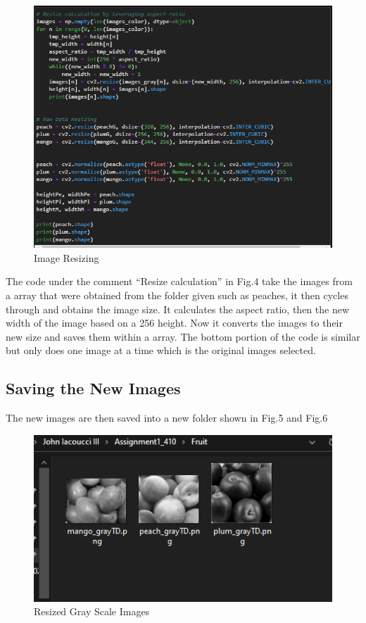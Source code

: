 \documentclass[conference]{IEEEtran}
\begin{document}
\begin{figure}[h]
  \centering
  \includegraphics[width=\linewidth]{ImagesResizing.png}
  \caption{Image Resizing}
\end{figure}

The code under the comment “Resize calculation” in Fig.4 take the images from a array that were obtained from the folder given such as peaches, it then cycles through and obtains the image size. It calculates the aspect ratio, then the new width of the image based on a 256 height. Now it converts the images to their new size and saves them within a array. The bottom portion of the code is similar but only does one image at a time which is the original images selected.

\subsection{Saving the New Images}
The new images are then saved into a new folder shown in Fig.5 and Fig.6

\begin{figure}[h]
  \centering
  \includegraphics[width=\linewidth]{Fruit.png}
  \caption{Resized Gray Scale Images}
\end{figure}
\end{document}
